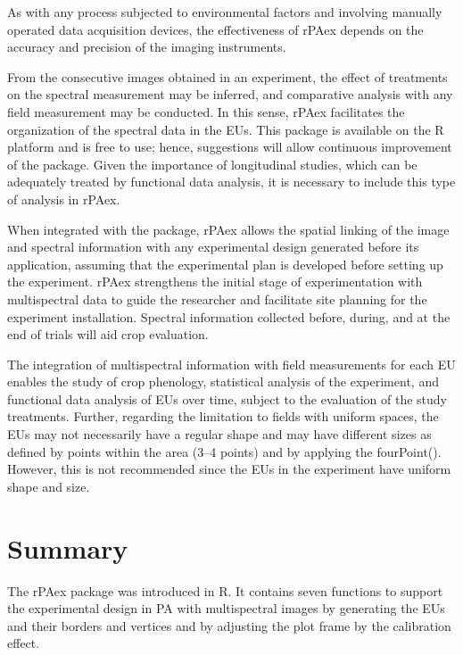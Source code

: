 As with any process subjected to environmental factors and involving manually operated data acquisition devices, the effectiveness of rPAex depends on the accuracy and precision of the imaging instruments.

From the consecutive images obtained in an experiment, the effect of treatments on the spectral measurement may be inferred, and comparative analysis with any field measurement may be conducted. In this sense, rPAex facilitates the organization of the spectral data in the EUs. This package is available on the R platform and is free to use; hence, suggestions will allow continuous improvement of the package. Given the importance of longitudinal studies, which can be adequately treated by functional data analysis, it is necessary to include this type of analysis in rPAex.

When integrated with the  package, rPAex allows the spatial linking of the image and spectral information with any experimental design generated before its application, assuming that the experimental plan is developed before setting up the experiment. rPAex strengthens the initial stage of experimentation with multispectral data to guide the researcher and facilitate site planning for the experiment installation. Spectral information collected before, during, and at the end of trials will aid crop evaluation.

The integration of multispectral information with field measurements for each EU enables the study of crop phenology, statistical analysis of the experiment, and functional data analysis of EUs over time, subject to the evaluation of the study treatments. Further, regarding the limitation to fields with uniform spaces, the EUs may not necessarily have a regular shape and may have different sizes as defined by points within the area (3--4 points) and by applying the fourPoint(). However, this is not recommended since the EUs in the experiment have uniform shape and size.

\section{Summary}\label{summary}

The rPAex package was introduced in R. It contains seven functions to support the experimental design in PA with multispectral images by generating the EUs and their borders and vertices and by adjusting the plot frame by the calibration effect.

